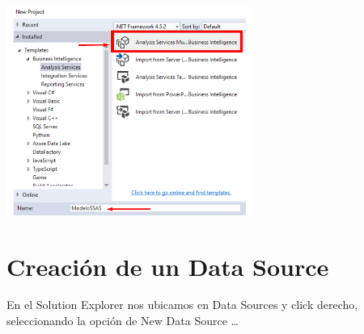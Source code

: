\begin{center}
	\includegraphics[width=8cm]{images/task1/img1}
\end{center}
\section{Creación de un Data Source}  
 En el Solution Explorer nos ubicamos en Data Sources y click derecho, seleccionando la opción de New
Data Source …
		

